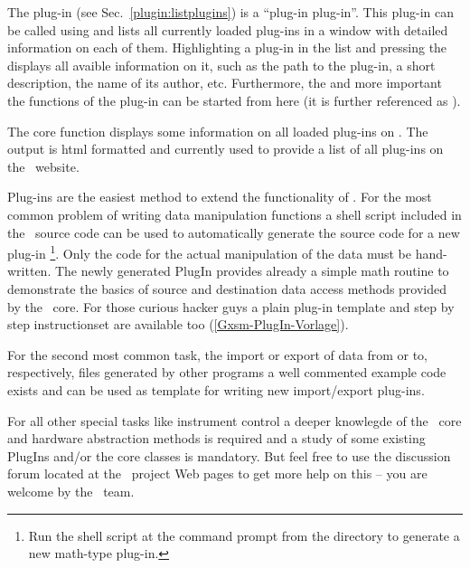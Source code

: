 The plug-in  (see Sec.\ \ref{plugin:listplugins})
is a ``plug-in plug-in''.  This plug-in can be called using
 and lists all currently loaded
plug-ins in a window with detailed information on each of them.
Highlighting a plug-in in the list and pressing the
 displays all avaible information on it, such as
the path to the plug-in, a short description, the name of its author,
etc.  Furthermore, the  and more important the
 functions of the plug-in can be started from here
(it is further referenced as ).

The core function  displays some information on
all loaded plug-ins on .  The output is html formatted and
currently used to provide a list of all plug-ins on the \Gxsm\ website.

Plug-ins are the easiest method to extend the functionality of \Gxsm.
For the most common problem of writing data manipulation functions a
shell script included in the \Gxsm\ source code can be used to
automatically generate the source code for a new plug-in \footnote{Run
  the shell script  at the
  command prompt from the  directory to
  generate a new math-type plug-in.}.  Only the code for the actual
manipulation of the data must be hand-written.  The newly generated
PlugIn provides already a simple math routine to demonstrate the
basics of source and destination data access methods provided by the
\Gxsm\ core. For those curious hacker guys a plain plug-in template
and step by step instructionset are available too
(\ref{Gxsm-PlugIn-Vorlage}).

For the second most common task, the import or export of data from or
to, respectively, files generated by other programs a well commented
example code exists and can be used as template for writing new
import/export plug-ins.

For all other special tasks like instrument control a deeper knowlegde
of the \Gxsm\ core and hardware abstraction methods is required and a
study of some existing PlugIns and/or the core classes is mandatory.
But feel free to use the discussion forum located at the \Gxsm\ 
project Web pages to get more help on this -- you are welcome by the
\Gxsm\ team.

